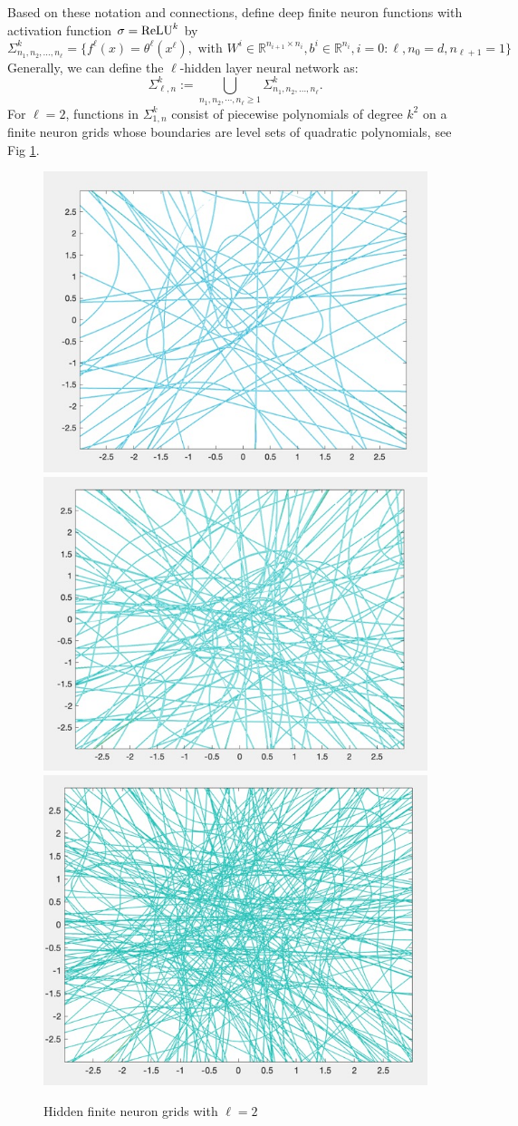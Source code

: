 Based on these notation and connections, define deep finite neuron
functions with activation function $\sigma={\rm ReLU}^k$ by
\begin{equation}
\label{NNL}
\Sigma^k_{n_1,n_2,\ldots, n_\ell}=\bigg\{ f^{\ell}(x) = \theta^\ell (x^{\ell}), 
 \mbox{ with } W^i\in \mathbb R^{n_{i+1}\times
	n_{i}}, b^i\in\mathbb R^{n_i}, i=0:\ell, n_0=d, n_{\ell+1}=1\bigg\}  
\end{equation}
Generally, we can define the $\ell$-hidden layer neural network as:
\begin{equation}
\Sigma^k_{\ell,n}:= \bigcup_{n_1, n_2, \cdots, n_{\ell}\ge 1}\Sigma^k_{n_1,n_2,\ldots, n_\ell}.
\end{equation}
For $\ell=2$, functions in $\Sigma^k_{1,n}$ consist of piecewise polynomials of degree $k^2$ on a finite neuron grids whose boundaries are level sets of quadratic polynomials, see Fig \ref{fig:3}.
\begin{figure}[!ht]
\begin{center} 
\includegraphics[width=.3\textwidth]{6DL/figures/2t20t20-1.jpg}   
\includegraphics[width=.3\textwidth]{6DL/figures/2t40t40-1.jpg}
\includegraphics[width=.28\textwidth]{6DL/figures/2t60t60-1.jpg}    
\caption{Hidden finite neuron grids with $\ell=2$}
\label{fig:3}
\end{center}
\end{figure} 

